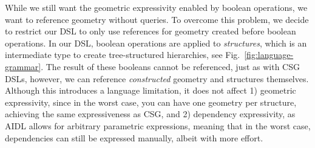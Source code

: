 While we still want the geometric expressivity enabled by boolean operations, we want to reference geometry without queries. %
To overcome this problem, we decide to restrict our DSL to only use references for geometry created before boolean operations. 
In our DSL, boolean operations are applied to \emph{structures}, which is an intermediate type to create tree-structured hierarchies, see Fig.~\ref{fig:language-grammar}.
The result of these booleans cannot be referenced, just as with CSG DSLs, however, we can reference \emph{constructed} geometry and structures themselves. 
Although this introduces a language limitation, it does not affect 1) geometric expressivity, since in the worst case, you can have one geometry per structure, achieving the same expressiveness as CSG, and 2) dependency expressivity, as AIDL allows for arbitrary parametric expressions, meaning that in the worst case, dependencies can still be expressed manually, albeit with more effort. %



